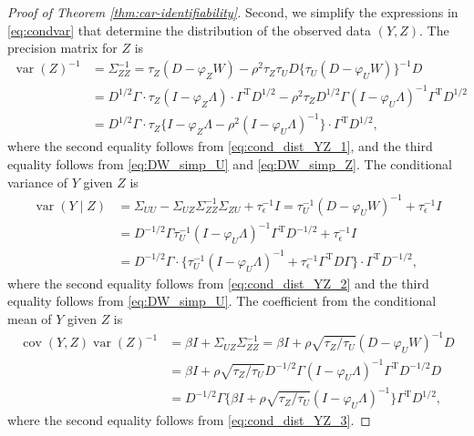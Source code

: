 \documentclass[11pt]{article}
\theoremstyle{definition}
\theoremstyle{remark}
\DeclareMathOperator{\var}{var}
\DeclareMathOperator{\cov}{cov}
\def\top{{ \mathrm{\scriptscriptstyle T} }}
\begin{document}
\begin{proof}[Proof of Theorem \ref{thm:car-identifiability}]
Second, we simplify the expressions in  \eqref{eq:condvar} that 
determine the distribution of the observed data $(Y,Z)$. 
The precision matrix for $Z$ is
\begin{align*}
     \var(Z)^{-1} & = \Sigma_{ZZ}^{-1}
     = \tau_Z(D-\varphi_Z W) - \rho^2\tau_Z\tau_U D \{ \tau_U(D-\varphi_U W) \}^{-1} D
     \\
    & = 
    D^{1/2} \Gamma \cdot \tau_Z (I- \varphi_Z \Lambda ) \cdot \Gamma^\top D^{1/2}
    - \rho^2\tau_Z
    D^{1/2}\Gamma 
     (I- \varphi_U \Lambda )^{-1} \Gamma^\top D^{1/2}\\
    & = D^{1/2} \Gamma \cdot \tau_Z 
     \big\{ I - \varphi_Z \Lambda - \rho^2 (I - \varphi_U \Lambda)^{-1} \big\} \cdot \Gamma^\top D^{1/2},
\end{align*}
where the second equality follows from \eqref{eq:cond_dist_YZ_1}, and 
the third equality follows from \eqref{eq:DW_simp_U} and \eqref{eq:DW_simp_Z}.  
The conditional variance of $Y$ given $Z$ is 
\begin{align*}
    \var (Y\mid Z) &= \Sigma_{UU} - \Sigma_{UZ} \Sigma_{ZZ}^{-1}\Sigma_{ZU} + \tau_\epsilon^{-1}  I
    = \tau_U^{-1}(D-\varphi_U W)^{-1} + \tau_\epsilon^{-1} I \\
    & = 
    D^{-1/2} \Gamma 
    \tau_U^{-1} (I- \varphi_U \Lambda )^{-1} \Gamma^\top D^{-1/2} + \tau_\epsilon^{-1} I
    \\
    &= D^{-1/2}\Gamma \cdot
    \big\{ \tau_U^{-1} (I-\varphi_U \Lambda)^{-1} 
    +\tau_{\epsilon}^{-1} \Gamma^\top D \Gamma
    \big\} \cdot
    \Gamma^{\top} D^{-1/2}, 
\end{align*}
where the second equality follows from \eqref{eq:cond_dist_YZ_2} and the third equality follows from \eqref{eq:DW_simp_U}. 
The coefficient from the conditional mean of $Y$ given $Z$ is 
\begin{align*}
    \cov(Y,Z) \var(Z)^{-1} &
     = \beta I + \Sigma_{UZ}\Sigma_{ZZ}^{-1}
    = \beta I + \rho\sqrt{\tau_Z/\tau_U} (D - \varphi_U W)^{-1} D\\
    & = 
    \beta I + \rho\sqrt{\tau_Z/\tau_U}
    D^{-1/2} \Gamma (I-\varphi_U \Lambda)^{-1} \Gamma^\top D^{-1/2} D
    \\
    &=D^{-1/2} \Gamma
    \big\{ \beta I +\rho \sqrt{\tau_Z/\tau_U} (I-\varphi_U \Lambda)^{-1} \big\} 
    \Gamma^{\top} D^{1/2}, 
\end{align*}
where the second equality follows from \eqref{eq:cond_dist_YZ_3}. 



\end{proof}
\end{document}
